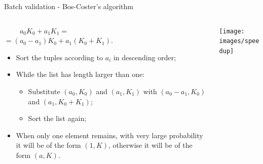 \documentclass[slidescentered]{beamer}
\begin{document}
	\begin{frame}{Batch validation - Bos-Coster's algorithm}
		\begin{columns}
			\begin{column}{0.5\linewidth}
				$\ \ \ \ \ \ \ \ \ \ a_0K_0 + a_1K_1 =$ \\ $= (a_0 - a_1)K_0 + a_1(K_0 + K_1)$.
				
				\bigskip
				
				\begin{itemize}
					\item Sort the tuples according to $a_i$ in descending order;
					\item While the list has length larger than one:
					\begin{itemize}
						\item Substitute $(a_0, K_0)$ and $(a_1, K_1)$ with $(a_0 - a_1, K_0)$ and $(a_1, K_0 + K_1)$;
						\item Sort the list again;
					\end{itemize}
					\item When only one element remains, with very large probability it will be of the form $(1, K)$, otherwise it will be of the form $(a, K)$.
				\end{itemize}
			\end{column}
			\begin{column}{0.5\linewidth}
				\hspace*{0cm}
				\texttt{[image: images/speedup]}
			\end{column}
		\end{columns}
	\end{frame}
\end{document}
